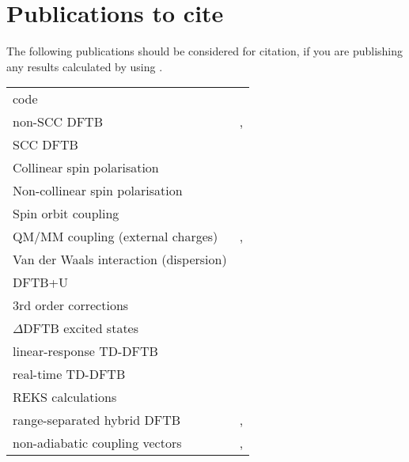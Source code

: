 \chapter{Publications to cite}

The following publications should be considered for citation, if you
are publishing any results calculated by using \dftbp.


\begin{tabular}{lr}
\dftbp{} code & \cite{dftbp-2020paper} \\
non-SCC DFTB & \cite{porezag-PRB-51-12947}, \cite{seifert-ijqc-58-185}
\\
SCC DFTB & \cite{elstner-prb-58-7260} \\
Collinear spin polarisation & \cite{koehler-cp-309-23} \\
Non-collinear spin polarisation & \cite{koehler-JPCA-111-5622} \\
Spin orbit coupling & \cite{koehler-JPCA-111-5622} \\
QM/MM coupling (external charges) & \cite{cui-jpcb-105-569},
\cite{han-ijqc-78-459} \\
Van der Waals interaction (dispersion) & \cite{elstner-jcp-114-5149} \\
DFTB+U & \cite{hourahine07}\\
3rd order corrections & \cite{yang-JPCA-111-10861} \\
$\Delta$DFTB excited states & \cite{irle-JCTC-12-313} \\
linear-response TD-DFTB  & \cite{niehaus-prb-63-085108}\\
real-time TD-DFTB  & \cite{realtime1}\\
REKS calculations & \cite{Lee_JCTC_2019} \\
range-separated hybrid DFTB & \cite{niehaus-PSSB-249-237},
                              \cite{lutsker-JCP-143-184107}\\
non-adiabatic coupling vectors &  \cite{niehaus2021ground}, \cite{niehaus2023exact}
\end{tabular}


